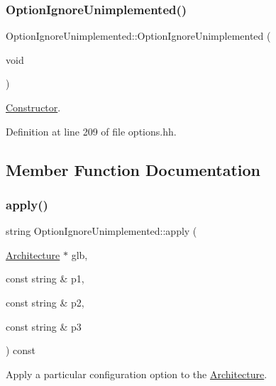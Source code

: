 \subsubsection{\texorpdfstring{OptionIgnoreUnimplemented()}{OptionIgnoreUnimplemented()}}
{\footnotesize\ttfamily Option\+Ignore\+Unimplemented\+::\+Option\+Ignore\+Unimplemented (\begin{DoxyParamCaption}\item[{void}]{ }\end{DoxyParamCaption})\hspace{0.3cm}{\ttfamily [inline]}}



\mbox{\hyperlink{class_constructor}{Constructor}}. 



Definition at line 209 of file options.\+hh.



\subsection{Member Function Documentation}
\mbox{\label{class_option_ignore_unimplemented_a459728e7576c3f9f873778201715249d}} 
\subsubsection{\texorpdfstring{apply()}{apply()}}
{\footnotesize\ttfamily string Option\+Ignore\+Unimplemented\+::apply (\begin{DoxyParamCaption}\item[{\mbox{\hyperlink{class_architecture}{Architecture}} $\ast$}]{glb,  }\item[{const string \&}]{p1,  }\item[{const string \&}]{p2,  }\item[{const string \&}]{p3 }\end{DoxyParamCaption}) const\hspace{0.3cm}{\ttfamily [virtual]}}



Apply a particular configuration option to the \mbox{\hyperlink{class_architecture}{Architecture}}. 

